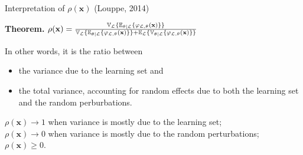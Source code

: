 \documentclass{beamer}
\begin{document}
\begin{frame}{Interpretation of $\rho(\mathbf{x})$ {\scriptsize (Louppe, 2014)}}

{\bf Theorem.} $\rho(\mathbf{x}) = \frac{\mathbb{V}_{\cal L} \{ \mathbb{E}_{\theta|{\cal L}} \{ \varphi_{{\cal L},\theta}(\mathbf{x}) \} \}}{\mathbb{V}_{\cal L} \{ \mathbb{E}_{\theta|{\cal L}} \{ \varphi_{{\cal L},\theta}(\mathbf{x}) \} \} + \mathbb{E}_{\cal L} \{ \mathbb{V}_{\theta|{\cal L}} \{ \varphi_{{\cal L},\theta}(\mathbf{x}) \} \}}$

\vspace{1cm}

In other words, it is the ratio between
\begin{itemize}
\item the variance due to the learning set and
\item the total variance, accounting for random effects due to both the
  learning set and the random perburbations.
\end{itemize}

\bigskip

$\rho(\mathbf{x}) \to 1$ when variance is mostly due to the learning set; \\
$\rho(\mathbf{x}) \to 0$ when variance is mostly due to the random perturbations;\\
$\rho(\mathbf{x}) \geq 0$.


\end{frame}
\end{document}
